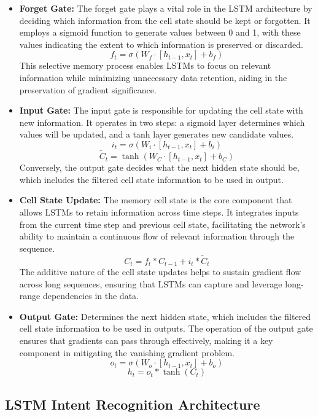 \begin{itemize}
  \item \textbf{Forget Gate:} The forget gate plays a vital role in the LSTM architecture by deciding which information from the cell state should be kept or forgotten. It employs a sigmoid function to generate values between 0 and 1, with these values indicating the extent to which information is preserved or discarded.
  \[
  f_t = \sigma(W_f \cdot [h_{t-1}, x_t] + b_f)
  \]
  This selective memory process enables LSTMs to focus on relevant information while minimizing unnecessary data retention, aiding in the preservation of gradient significance.

  \item \textbf{Input Gate:} The input gate is responsible for updating the cell state with new information. It operates in two steps: a sigmoid layer determines which values will be updated, and a tanh layer generates new candidate values.
  \[
  i_t = \sigma(W_i \cdot [h_{t-1}, x_t] + b_i)
  \]
  \[
  \tilde{C}_t = \tanh(W_C \cdot [h_{t-1}, x_t] + b_C)
  \]
  Conversely, the output gate decides what the next hidden state should be, which includes the filtered cell state information to be used in output.

  \item \textbf{Cell State Update:} The memory cell state is the core component that allows LSTMs to retain information across time steps. It integrates inputs from the current time step and previous cell state, facilitating the network's ability to maintain a continuous flow of relevant information through the sequence.
  \[
  C_t = f_t \ast C_{t-1} + i_t \ast \tilde{C}_t
  \]
  The additive nature of the cell state updates helps to sustain gradient flow across long sequences, ensuring that LSTMs can capture and leverage long-range dependencies in the data.

  \item \textbf{Output Gate:} Determines the next hidden state, which includes the filtered cell state information to be used in outputs. The operation of the output gate ensures that gradients can pass through effectively, making it a key component in mitigating the vanishing gradient problem.
  \[
  o_t = \sigma(W_o \cdot [h_{t-1}, x_t] + b_o)
  \]
  \[
  h_t = o_t \ast \tanh(C_t)
  \]
\end{itemize}

\subsection{LSTM Intent Recognition Architecture}


